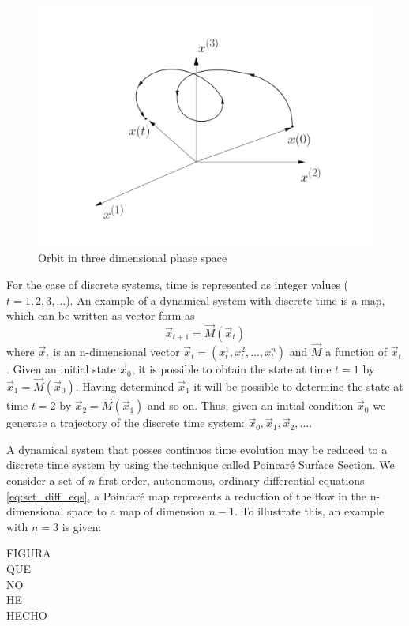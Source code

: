 \begin{figure}[H]
\centering
\includegraphics[width=1.\textwidth]{Figures/orbit_3d.pdf}
\caption{Orbit in three dimensional phase space}
\end{figure}

For the case of discrete systems, time is represented as integer values ($t=1,2,3,...$). An example of a dynamical system with discrete time is a map, which can be written as vector form as
\begin{equation}
\vec{x}_{t+1}=\vec{M}(\vec{x}_t)
\label{eq:discrete_dyn_sys}
\end{equation}
where $\vec{x}_t$ is an n-dimensional vector $\vec{x}_t=(x^{1}_t,x^{2}_t,...,x^{n}_t)$ and $\vec{M}$ a function of $\vec{x}_t$. Given an initial state $\vec{x}_0$, it is possible to obtain the state at time $t=1$ by $\vec{x}_{1}=\vec{M}(\vec{x}_0)$. Having determined $\vec{x}_1$ it will be possible to determine the state at time $t=2$ by $\vec{x}_2=\vec{M}(\vec{x}_1)$ and so on. Thus, given an initial condition $\vec{x}_0$ we generate a trajectory of the discrete time system: $\vec{x}_0,\vec{x}_1,\vec{x}_2,...$. 

A dynamical system that posses continuos time evolution may be reduced to a discrete time system by using the technique called Poincaré Surface Section. We consider a set of $n$ first order, autonomous, ordinary differential equations \ref{eq:set_diff_eqs}, a Poincaré map represents a reduction of the flow in the n-dimensional space to a map of dimension $n-1$. To illustrate this, an example with $n=3$ is given:

FIGURA\\
QUE\\
NO\\
HE\\
HECHO\\

